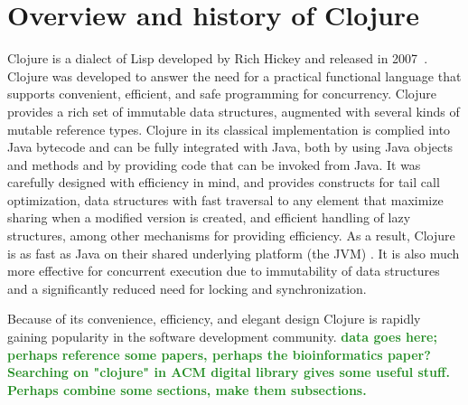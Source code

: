 \documentclass[submission,copyright,creativecommons]{eptcs}
\newcommand{\allcomments}[1]{{#1}}
\newcommand{\elenacomment}[1]{{\bf \textcolor{ForestGreen}{\allcomments{{#1}}}}}
\newcommand{\stephencomment}[1]{{\bf \color{StephensBlue}{\allcomments{{#1}}}}} %
\newcommand{\joecomment}[1]{{\bf \color{JoesGold}{\allcomments{{#1}}}}}
\begin{document}
\section{Overview and history of Clojure}
Clojure is a dialect of Lisp developed by Rich Hickey and released in 2007~\cite{Hickey:2008}. Clojure was developed to answer the need for a practical  functional language that supports convenient, efficient, and safe programming for concurrency. Clojure provides a rich set of immutable data structures, augmented with several kinds of mutable reference types. Clojure in its classical implementation is complied into Java bytecode and can be fully integrated with Java, both by using Java objects and methods and by providing code that can be invoked from Java. It was carefully designed with efficiency in mind, and provides constructs for tail call optimization,
data structures with fast traversal to any element that maximize sharing when a modified version is created, and efficient handling of lazy structures, among other mechanisms for providing efficiency. As a result, Clojure is as fast as Java on their shared underlying platform (the JVM) %
. It is also much more effective %
for concurrent execution due to immutability of data structures and a significantly reduced need for locking and synchronization. 

Because of its convenience, efficiency, and elegant design 
Clojure is rapidly gaining popularity in the software development community. \elenacomment{data goes here; perhaps reference some papers, perhaps the bioinformatics paper? Searching on "clojure" in ACM digital library gives some useful stuff.}
\elenacomment{Perhaps combine some sections, make them subsections.}
\end{document}

